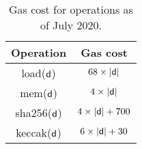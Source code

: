 \begin{table}[]
\begin{tabular}{|c|c|}
\hline
\textbf{Operation} & \textbf{Gas cost} \\ \hline
\textsf{load}($\mathsf{d}$)            & $68 \times |\mathsf{d}|$          \\ \hline
\textsf{mem}($\mathsf{d}$)             & $4 \times |\mathsf{d}|$           \\ \hline
\textsf{sha256}($\mathsf{d}$)          & $4 \times |\mathsf{d}| + 700$     \\ \hline
\textsf{keccak}($\mathsf{d}$)          & $6 \times |\mathsf{d}| + 30$      \\ \hline
\end{tabular}
\caption{Gas cost for operations as of July 2020.}
\label{tab:operations-gas}
\end{table}
